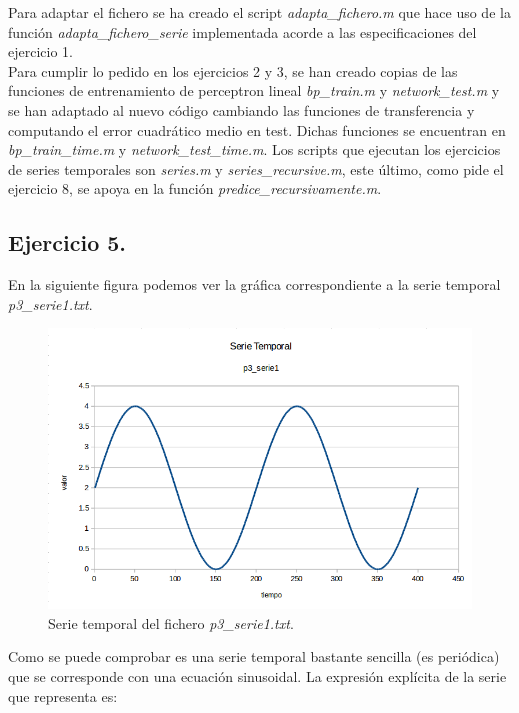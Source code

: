 \documentclass[spanish]{assignment}
\begin{document}
	Para adaptar el fichero se ha creado el script \textit{adapta\_fichero.m} que hace uso de la función \textit{adapta\_fichero\_serie} implementada acorde a las especificaciones del ejercicio 1.\\
	
	Para cumplir lo pedido en los ejercicios 2 y 3, se han creado copias de las funciones de entrenamiento de perceptron lineal \textit{bp\_train.m} y \textit{network\_test.m} y se han adaptado al nuevo código cambiando las funciones de transferencia y computando el error cuadrático medio en test. Dichas funciones se encuentran en \textit{bp\_train\_time.m} y \textit{network\_test\_time.m}. Los scripts que ejecutan los ejercicios de series temporales son \textit{series.m} y \textit{series\_recursive.m}, este último, como pide el ejercicio 8, se apoya en la función \textit{predice\_recursivamente.m}.
	
	\subsection{Ejercicio 5.}
	En la siguiente figura podemos ver la gráfica correspondiente a la serie temporal \textit{p3\_serie1.txt}.
	
		\begin{figure}[H]
			\centering
			\includegraphics[scale=0.4]{p3_serie1.png}		
			\caption{Serie temporal del fichero \textit{p3\_serie1.txt}.}				
		\end{figure}
	
	Como se puede comprobar es una serie temporal bastante sencilla (es periódica) que se corresponde con una ecuación sinusoidal. La expresión explícita de la serie que representa es:
	
\end{document}
